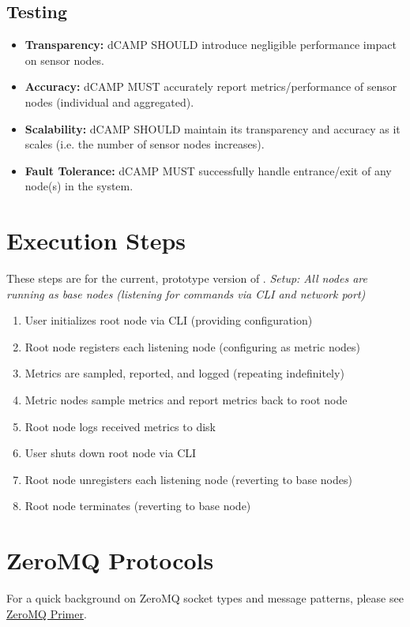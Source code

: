 \subsection{Testing}

\begin{itemize}

\item \textbf{Transparency:} dCAMP SHOULD introduce negligible performance impact on sensor nodes.

\item \textbf{Accuracy:} dCAMP MUST accurately report metrics/performance of sensor nodes (individual and aggregated).

\item \textbf{Scalability:} dCAMP SHOULD maintain its transparency and accuracy as it scales (i.e. the number of sensor nodes
increases).

\item \textbf{Fault Tolerance:} dCAMP MUST successfully handle entrance/exit of any node(s) in the system.

\end{itemize}

\section{Execution Steps}

These steps are for the current, prototype version of \dcamp. \textit{Setup: All nodes are running as base nodes
(listening for commands via CLI and network port)}

\begin{enumerate}

\item User initializes root node via CLI (providing configuration) 
\item Root node registers each listening node (configuring as metric nodes) 
\item Metrics are sampled, reported, and logged (repeating indefinitely) 
\item Metric nodes sample metrics and report metrics back to root node 
\item Root node logs received metrics to disk 
\item User shuts down root node via CLI 
\item Root node unregisters each listening node (reverting to base nodes) 
\item Root node terminates (reverting to base node)

\end{enumerate}

\section{ZeroMQ Protocols}

For a quick background on ZeroMQ socket types and message patterns, please see \hyperref[zeromq_primer]{ZeroMQ Primer}.




% 
